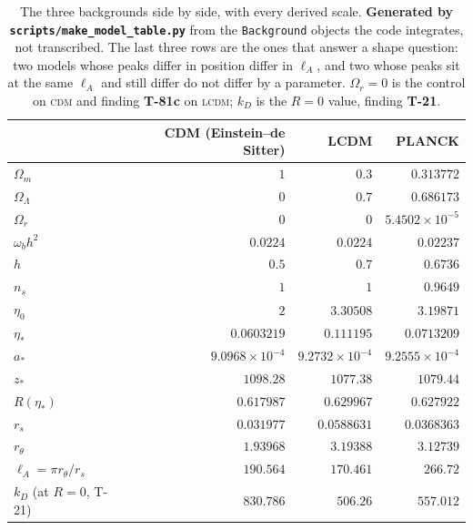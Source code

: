 \begin{table}[htbp]
\centering\small
\caption{The three backgrounds side by side, with every derived scale. \textbf{Generated by \texttt{scripts/make\_model\_table.py}} from the \texttt{Background} objects the code integrates, not transcribed. The last three rows are the ones that answer a shape question: two models whose peaks differ in position differ in $\ell_A$, and two whose peaks sit at the same $\ell_A$ and still differ do not differ by a parameter. $\Omega_r=0$ is the control on \textsc{cdm} and finding \textbf{T-81c} on \textsc{lcdm}; $k_D$ is the $R=0$ value, finding \textbf{T-21}.}
\label{tab:model-parameters}
\begin{tabular}{lrrr}
\toprule
 & CDM (Einstein--de Sitter) & LCDM & PLANCK \\
\midrule
$\Omega_m$ & $1$ & $0.3$ & $0.313772$ \\
$\Omega_\Lambda$ & $0$ & $0.7$ & $0.686173$ \\
$\Omega_r$ & $0$ & $0$ & $5.4502\times10^{-5}$ \\
$\omega_b h^2$ & $0.0224$ & $0.0224$ & $0.02237$ \\
$h$ & $0.5$ & $0.7$ & $0.6736$ \\
$n_s$ & $1$ & $1$ & $0.9649$ \\
$\eta_0$ & $2$ & $3.30508$ & $3.19871$ \\
$\eta_*$ & $0.0603219$ & $0.111195$ & $0.0713209$ \\
$a_*$ & $9.0968\times10^{-4}$ & $9.2732\times10^{-4}$ & $9.2555\times10^{-4}$ \\
$z_*$ & $1098.28$ & $1077.38$ & $1079.44$ \\
$R(\eta_*)$ & $0.617987$ & $0.629967$ & $0.627922$ \\
$r_s$ & $0.031977$ & $0.0588631$ & $0.0368363$ \\
$r_\theta$ & $1.93968$ & $3.19388$ & $3.12739$ \\
$\ell_A=\pi r_\theta/r_s$ & $190.564$ & $170.461$ & $266.72$ \\
$k_D$ (at $R=0$, T-21) & $830.786$ & $506.26$ & $557.012$ \\
\bottomrule
\end{tabular}
\end{table}
